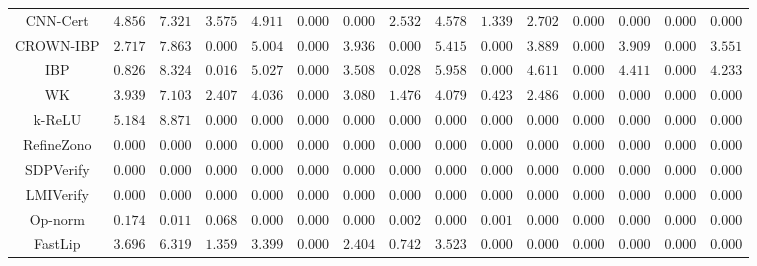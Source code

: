 \begin{table*}
{\begin{tabular}{c|c|c|c|c|c|c|c|c|c|c|c|c|c|c}
     CNN-Cert &       $4.856$ &       $7.321$ &       $3.575$ &       $4.911$ &       $0.000$ &       $0.000$ &       $2.532$ &       $4.578$ &       $1.339$ &       $2.702$ &       $0.000$ &       $0.000$ &       $0.000$ &       $0.000$ \\
    CROWN-IBP &       $2.717$ &       $7.863$ &       $0.000$ &       $5.004$ &       $0.000$ &       $3.936$ &       $0.000$ &       $5.415$ &       $0.000$ &       $3.889$ &       $0.000$ &       $3.909$ &       $0.000$ &       $3.551$ \\
          IBP &       $0.826$ &       $8.324$ &       $0.016$ &       $5.027$ &       $0.000$ &       $3.508$ &       $0.028$ &       $5.958$ &       $0.000$ &       $4.611$ &       $0.000$ &       $4.411$ &       $0.000$ &       $4.233$ \\
           WK &       $3.939$ &       $7.103$ &       $2.407$ &       $4.036$ &       $0.000$ &       $3.080$ &       $1.476$ &       $4.079$ &       $0.423$ &       $2.486$ &       $0.000$ &       $0.000$ &       $0.000$ &       $0.000$ \\
       k-ReLU &       $5.184$ &       $8.871$ &       $0.000$ &       $0.000$ &       $0.000$ &       $0.000$ &       $0.000$ &       $0.000$ &       $0.000$ &       $0.000$ &       $0.000$ &       $0.000$ &       $0.000$ &       $0.000$ \\
   RefineZono &       $0.000$ &       $0.000$ &       $0.000$ &       $0.000$ &       $0.000$ &       $0.000$ &       $0.000$ &       $0.000$ &       $0.000$ &       $0.000$ &       $0.000$ &       $0.000$ &       $0.000$ &       $0.000$ \\
    SDPVerify &       $0.000$ &       $0.000$ &       $0.000$ &       $0.000$ &       $0.000$ &       $0.000$ &       $0.000$ &       $0.000$ &       $0.000$ &       $0.000$ &       $0.000$ &       $0.000$ &       $0.000$ &       $0.000$ \\
    LMIVerify &       $0.000$ &       $0.000$ &       $0.000$ &       $0.000$ &       $0.000$ &       $0.000$ &       $0.000$ &       $0.000$ &       $0.000$ &       $0.000$ &       $0.000$ &       $0.000$ &       $0.000$ &       $0.000$ \\
      Op-norm &       $0.174$ &       $0.011$ &       $0.068$ &       $0.000$ &       $0.000$ &       $0.000$ &       $0.002$ &       $0.000$ &       $0.001$ &       $0.000$ &       $0.000$ &       $0.000$ &       $0.000$ &       $0.000$ \\
      FastLip &       $3.696$ &       $6.319$ &       $1.359$ &       $3.399$ &       $0.000$ &       $2.404$ &       $0.742$ &       $3.523$ &       $0.000$ &       $0.000$ &       $0.000$ &       $0.000$ &       $0.000$ &       $0.000$ \\

\end{tabular}}
\end{table*}
